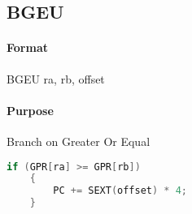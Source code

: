 \subsection{BGEU}


\paragraph{Format} BGEU ra, rb, offset

\paragraph{Purpose} Branch on Greater Or Equal

\begin{lstlisting}[language=c]
    if (GPR[ra] >= GPR[rb])
    {
        PC += SEXT(offset) * 4;
    }
\end{lstlisting}
